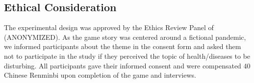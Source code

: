 


\subsection{Ethical Consideration}
The experimental design was approved by the Ethics Review Panel of (ANONYMIZED). As the game story was centered around a fictional pandemic, we informed participants about the theme in the consent form and asked them not to participate in the study if they perceived the topic of health/diseases to be disturbing.  All participants gave their informed consent and were compensated 40 Chinese Renminbi upon completion of the game and interviews.